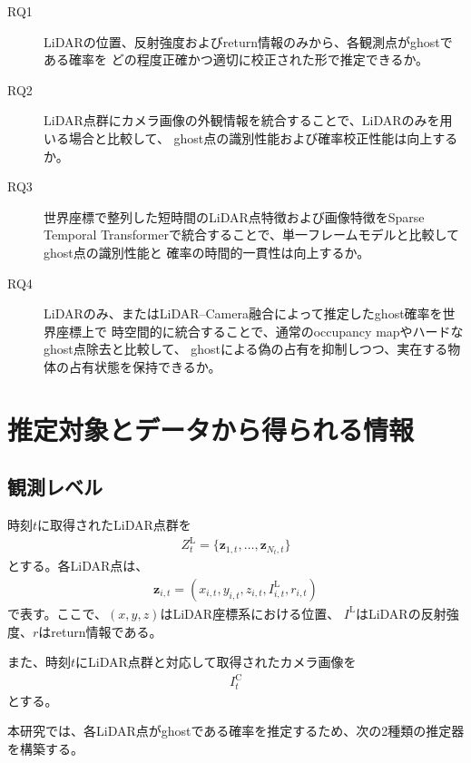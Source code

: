 \documentclass[uplatex,a4paper,11pt]{jsarticle}
\begin{document}
\begin{description}

  \item[RQ1]
  LiDARの位置、反射強度およびreturn情報のみから、各観測点がghostである確率を
  どの程度正確かつ適切に校正された形で推定できるか。

  \item[RQ2]
  LiDAR点群にカメラ画像の外観情報を統合することで、LiDARのみを用いる場合と比較して、
  ghost点の識別性能および確率校正性能は向上するか。

  \item[RQ3]
  世界座標で整列した短時間のLiDAR点特徴および画像特徴をSparse Temporal
  Transformerで統合することで、単一フレームモデルと比較してghost点の識別性能と
  確率の時間的一貫性は向上するか。

  \item[RQ4]
  LiDARのみ、またはLiDAR--Camera融合によって推定したghost確率を世界座標上で
  時空間的に統合することで、通常のoccupancy mapやハードなghost点除去と比較して、
  ghostによる偽の占有を抑制しつつ、実在する物体の占有状態を保持できるか。

\end{description}

\section{推定対象とデータから得られる情報}

\subsection{観測レベル}

時刻$t$に取得されたLiDAR点群を
\begin{align}
  Z_t^{\mathrm{L}}
  =
  \{
    \bm{z}_{1,t},
    \ldots,
    \bm{z}_{N_t,t}
  \}
\end{align}
とする。各LiDAR点は、
\begin{align}
  \bm{z}_{i,t}
  =
  (x_{i,t},y_{i,t},z_{i,t},I_{i,t}^{\mathrm{L}},r_{i,t})
\end{align}
で表す。ここで、$(x,y,z)$はLiDAR座標系における位置、
$I^{\mathrm{L}}$はLiDARの反射強度、$r$はreturn情報である。

また、時刻$t$にLiDAR点群と対応して取得されたカメラ画像を
\begin{align}
  I_t^{\mathrm{C}}
\end{align}
とする。

本研究では、各LiDAR点がghostである確率を推定するため、次の2種類の推定器を構築する。
\end{document}
